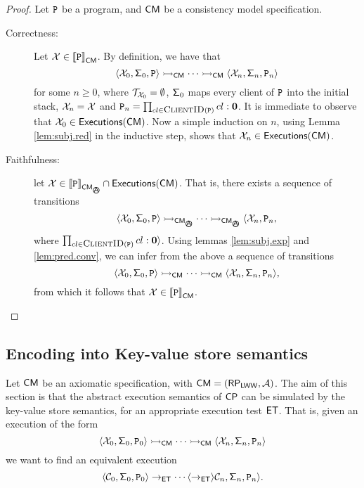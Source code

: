 \begin{proof}
Let $\texttt{P}$ be a program, and $\mathsf{CM}$ be a consistency model specification.
\begin{description}
\item[Correctness:] Let $\mathcal{X} \in {\llbracket \texttt{P}\rrbracket}_{\mathsf{CM}}$. By definition, we have that 
\[ 
\langle \mathcal{X}_0, \mathsf{\Sigma}_{0}, \texttt{P} \rangle \rightarrowtail_{\mathsf{CM}} \cdots \rightarrowtail_{\mathsf{CM}} \langle \mathcal{X}_{n}, \mathsf{\Sigma}_{n}, 
\texttt{P}_{n} \rangle 
\]
for some $n \geq 0$, where $\mathcal{T}_{\mathcal{X}_0} = \emptyset$, $\mathsf{\Sigma}_{0}$ maps every client of $\texttt{P}$ into the initial stack, 
$\mathcal{X}_n = \mathcal{X}$
and $\prog_{n} = \prod_{\tid \in \Clients(\prog)} \tid: \nil$. It is immediate to observe that 
$\mathcal{X}_0 \in {\mathsf{Executions}}(\mathsf{CM})$. Now a simple induction on $n$, using Lemma \ref{lem:subj.red} 
in the inductive step, shows that $\mathcal{X}_n \in {\mathsf{Executions}}(\mathsf{CM})$.
\item[Faithfulness:] let $\aexec \in \interpr{\prog}_{\CM_{\anarchicsmall}} \cap \aeset(\CM)$. 
That is, there exists a sequence of transitions 
\[
\langle \aexec_0, \thdstackFun_{0}, \prog \rangle \absrightarrow_{\CM_{\anarchicsmall}} \cdots \absrightarrow_{\CM_{\anarchicsmall}} \langle \aexec_{n}, \prog_n, 
\]
where $\prod_{\tid \in \Clients(\prog)} \tid: \nil \rangle$.
Using lemmas \ref{lem:subj.exp} and \ref{lem:pred.conv}, we can infer from the above a sequence of transitions
\[
\langle \mathcal{X}_0, \mathsf{\Sigma}_{0}, \texttt{P} \rangle \rightarrowtail_{\mathsf{CM}} \cdots \rightarrowtail_{\mathsf{CM}} \langle \mathcal{X}_{n}, \mathsf{\Sigma}_{n}, 
\texttt{P}_{n} \rangle,
\]
from which it follows that $\mathcal{X} \in {\llbracket \texttt{P}\rrbracket}_{\mathsf{CM}}$.
\end{description}
\end{proof}

\subsection{Encoding into Key-value store semantics}
Let $\mathsf{CM}$ be an axiomatic specification, with $\mathsf{CM} = (\mathsf{RP}_{\mathsf{LWW}}, \mathcal{A})$. 
The aim of this section is that the abstract execution semantics of $\mathsf{CP}$ can be 
simulated by the key-value store semantics, for an appropriate execution test $\mathsf{ET}$. 
That is, given an execution of the form 
\[
\langle \mathcal{X}_0, \mathsf{\Sigma}_{0}, \texttt{P}_0 \rangle \rightarrowtail_{\mathsf{CM}} \cdots \rightarrowtail_{\mathsf{CM}} \langle \mathcal{X}_{n}, \mathsf{\Sigma}_{n}, \texttt{P}_{n} \rangle
\]
we want to find an equivalent execution 
\[
\langle \mathcal{C}_{0}, \mathsf{\Sigma}_{0}, \texttt{P}_0 \rangle \rightarrow_{\mathsf{ET}} \cdots \langle \rightarrow_{\mathsf{ET}} \rangle \mathcal{C}_n, \mathsf{\Sigma}_{n}, \texttt{P}_{n} 
\rangle.
\]


